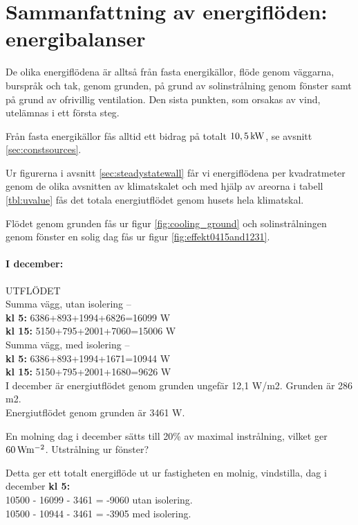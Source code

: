 \section{Sammanfattning av energiflöden: energibalanser}

De olika energiflödena är alltså från fasta energikällor, flöde genom väggarna, burspråk och tak, genom grunden, på grund av solinstrålning genom fönster samt på grund av ofrivillig ventilation. Den sista punkten, som orsakas av vind, utelämnas i ett första steg.

Från fasta energikällor fås alltid ett bidrag på totalt $\unit[10,5]{kW}$, se avsnitt \ref{sec:constsources}.

Ur figurerna i avsnitt \ref{sec:steadystatewall} får vi energiflödena per kvadratmeter genom de olika avsnitten av klimatskalet och med hjälp av areorna i tabell \ref{tbl:uvalue} fås det totala energiutflödet genom husets hela klimatskal.

Flödet genom grunden fås ur figur \ref{fig:cooling_ground} och solinstrålningen genom fönster en solig dag fås ur figur \ref{fig:effekt0415and1231}.


\paragraph{I december:}
UTFLÖDET\\
Summa vägg, utan isolering –\\
\textbf{kl 5:} 6386+893+1994+6826=16099 W\\
\textbf{kl 15:} 5150+795+2001+7060=15006 W\\

Summa vägg, med isolering –\\
\textbf{kl 5:} 6386+893+1994+1671=10944 W\\
\textbf{kl 15:} 5150+795+2001+1680=9626 W\\

I december är energiutflödet genom grunden ungefär 12,1 W/m2. Grunden är 286 m2.\\
Energiutflödet genom grunden är 3461 W.

En molning dag i december sätts till 20\% av maximal instrålning, vilket ger $\unit[60]{Wm^{-2}}$. Utstrålning ur fönster?

Detta ger ett totalt energiflöde ut ur fastigheten en molnig, vindstilla, dag i december \textbf{kl 5:}\\
10500 - 16099 - 3461 = -9060 utan isolering.\\
10500 - 10944 - 3461 = -3905 med isolering.\\

